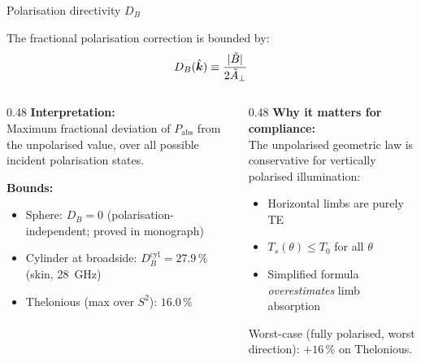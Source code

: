 \begin{frame}[label=app-p2-sensitivity]{Polarisation directivity $D_B$}

  The fractional polarisation correction is bounded by:
  \[
    D_B(\hat{\bm{k}}) \equiv \frac{|\tilde{B}|}{2\tilde{A}_\perp}
  \]

  \begin{columns}[T]
    \begin{column}{0.48\textwidth}
      \textbf{Interpretation:}\\
      Maximum fractional deviation of $P_{\mathrm{abs}}$ from the unpolarised value, over all possible incident polarisation states.

      \vspace{3pt}
      \textbf{Bounds:}
      \begin{itemize}
        \item Sphere: $D_B = 0$ (polarisation-independent; proved in monograph)
        \item Cylinder at broadside: $D_B^{\mathrm{cyl}} = 27.9\,\%$ (skin, \SI{28}{\giga\hertz})
        \item Thelonious (max over $S^2$): $16.0\,\%$
      \end{itemize}
    \end{column}

    \begin{column}{0.48\textwidth}
      \textbf{Why it matters for compliance:}\\[4pt]
      The unpolarised geometric law is conservative for vertically polarised illumination:
      \begin{itemize}
        \item Horizontal limbs are purely TE
        \item $T_s(\theta) \le T_0$ for all $\theta$
        \item Simplified formula \emph{overestimates} limb absorption
      \end{itemize}

      \vspace{0pt}
      {\footnotesize Worst-case (fully polarised, worst direction): $+16\,\%$ on Thelonious.}
    \end{column}
  \end{columns}
  \vspace{-4pt}
  \quad{}
\end{frame}

